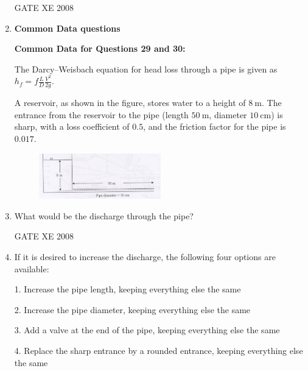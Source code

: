 \documentclass[12pt]{article}
\begin{document}
\begin{enumerate}[label=Q\arabic*.]
GATE XE 2008
\item[] \textbf{\Large Common Data questions}

\textbf{Common Data for Questions 29 and 30:}  

The Darcy–Weisbach equation for head loss through a pipe is given as  
$h_f = f \frac{L}{D} \frac{V^2}{2g}$.  

A reservoir, as shown in the figure, stores water to a height of $8 \ \text{m}$.  
The entrance from the reservoir to the pipe (length $50 \ \text{m}$, diameter $10 \ \text{cm}$) is sharp, with a loss coefficient of $0.5$, and the friction factor for the pipe is $0.017$.  

\begin{figure}[H]
\centering
  \includegraphics[width=0.5\textwidth]{figs/ass1_d_q29.png}
  \caption{}
\end{figure} 

\item What would be the discharge through the pipe?  

\begin{enumerate}[label=(\Alph*)]
\end{enumerate}

GATE XE 2008

\item If it is desired to increase the discharge, the following four options are available:  

1. Increase the pipe length, keeping everything else the same  

2. Increase the pipe diameter, keeping everything else the same  

3. Add a valve at the end of the pipe, keeping everything else the same 

4. Replace the sharp entrance by a rounded entrance, keeping everything else the same  


\end{enumerate}
\end{document}
